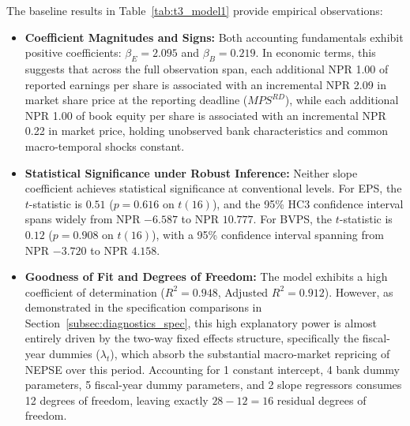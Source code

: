 The baseline results in Table~\ref{tab:t3_model1} provide empirical observations:
\begin{itemize}
    \item \textbf{Coefficient Magnitudes and Signs:} Both accounting fundamentals exhibit positive coefficients: $\beta_E = 2.095$ and $\beta_B = 0.219$. In economic terms, this suggests that across the full observation span, each additional NPR 1.00 of reported earnings per share is associated with an incremental NPR 2.09 in market share price at the reporting deadline ($\mathit{MPS}^{RD}$), while each additional NPR 1.00 of book equity per share is associated with an incremental NPR 0.22 in market price, holding unobserved bank characteristics and common macro-temporal shocks constant.
    \item \textbf{Statistical Significance under Robust Inference:} Neither slope coefficient achieves statistical significance at conventional levels. For EPS, the $t$-statistic is $0.51$ ($p = 0.616$ on $t(16)$), and the 95\% HC3 confidence interval spans widely from NPR $-6.587$ to NPR $10.777$. For BVPS, the $t$-statistic is $0.12$ ($p = 0.908$ on $t(16)$), with a 95\% confidence interval spanning from NPR $-3.720$ to NPR $4.158$.
    \item \textbf{Goodness of Fit and Degrees of Freedom:} The model exhibits a high coefficient of determination ($R^2 = 0.948$, Adjusted $R^2 = 0.912$). However, as demonstrated in the specification comparisons in Section~\ref{subsec:diagnostics_spec}, this high explanatory power is almost entirely driven by the two-way fixed effects structure, specifically the fiscal-year dummies ($\lambda_t$), which absorb the substantial macro-market repricing of NEPSE over this period. Accounting for 1 constant intercept, 4 bank dummy parameters, 5 fiscal-year dummy parameters, and 2 slope regressors consumes 12 degrees of freedom, leaving exactly $28 - 12 = 16$ residual degrees of freedom.
\end{itemize}

